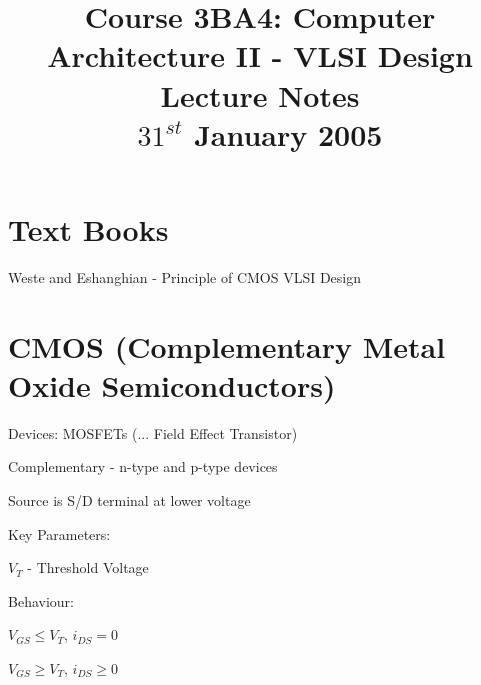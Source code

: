 \documentclass[a4paper,12pt]{article}
\begin{document}
\title{Course 3BA4: Computer Architecture II - VLSI Design \\ Lecture Notes \\ $31^{st}$ January 2005}

\maketitle

\section*{Text Books}

Weste and Eshanghian - Principle of CMOS VLSI Design


\section*{CMOS (Complementary Metal Oxide Semiconductors)}

Devices: MOSFETs (... Field Effect Transistor)

\begin{table}[hbtp]


\caption{Complementary - n-type and p-type devices}

\end{table}

\begin{table}[hbtp]


\caption{Source is S/D terminal at lower voltage}

\end{table}

Key Parameters:

$V_{T}$ - Threshold Voltage

Behaviour:

$V_{GS} \leq V_{T}$, $i_{DS} = 0$

$V_{GS} \geq V_{T}$, $i_{DS} \geq 0$

\begin{table}[hbtp]


\end{table}

\begin{table}[hbtp]


\end{table}
\end{document}
